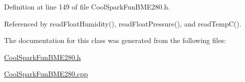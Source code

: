 Definition at line 149 of file Cool\+Spark\+Fun\+B\+M\+E280.\+h.



Referenced by read\+Float\+Humidity(), read\+Float\+Pressure(), and read\+Temp\+C().



The documentation for this class was generated from the following files\+:\begin{DoxyCompactItemize}
\item 
\hyperlink{_cool_spark_fun_b_m_e280_8h}{Cool\+Spark\+Fun\+B\+M\+E280.\+h}\item 
\hyperlink{_cool_spark_fun_b_m_e280_8cpp}{Cool\+Spark\+Fun\+B\+M\+E280.\+cpp}\end{DoxyCompactItemize}
